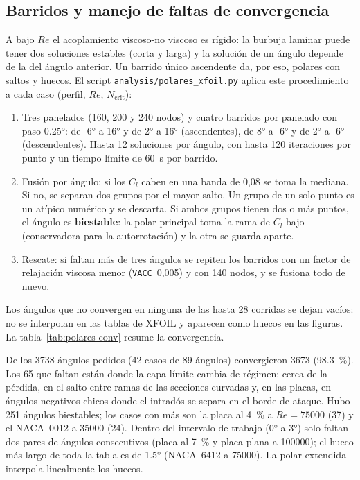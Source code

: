 \subsection{Barridos y manejo de faltas de convergencia}
A bajo $Re$ el acoplamiento viscoso-no viscoso es rígido: la burbuja laminar puede tener
dos soluciones estables (corta y larga) y la solución de un ángulo depende de la del ángulo
anterior. Un barrido único ascendente da, por eso, polares con saltos y huecos. El script
\texttt{analysis/polares\_xfoil.py} aplica este procedimiento a cada caso (perfil, $Re$,
$N_{\text{crit}}$):
\begin{enumerate}
  \item Tres panelados (160, 200 y 240 nodos) y cuatro barridos por panelado con paso
        \ang{0.25}: de \ang{-6} a \ang{16} y de \ang{2} a \ang{16} (ascendentes), de
        \ang{8} a \ang{-6} y de \ang{2} a \ang{-6} (descendentes). Hasta 12 soluciones por
        ángulo, con hasta 120 iteraciones por punto y un tiempo límite de \SI{60}{s} por
        barrido.
  \item Fusión por ángulo: si los $C_l$ caben en una banda de 0,08 se toma la mediana. Si
        no, se separan dos grupos por el mayor salto. Un grupo de un solo punto es un
        atípico numérico y se descarta. Si ambos grupos tienen dos o más puntos, el ángulo es
        \textbf{biestable}: la polar principal toma la rama de $C_l$ bajo (conservadora para
        la autorrotación) y la otra se guarda aparte.
  \item Rescate: si faltan más de tres ángulos se repiten los barridos con un factor de
        relajación viscosa menor (\texttt{VACC}~0,005) y con 140 nodos, y se fusiona todo
        de nuevo.
\end{enumerate}
Los ángulos que no convergen en ninguna de las hasta 28 corridas se dejan vacíos: no se
interpolan en las tablas de XFOIL y aparecen como huecos en las figuras. La
tabla~\ref{tab:polares-conv} resume la convergencia.

De los \num{3738} ángulos pedidos (42 casos de 89 ángulos) convergieron \num{3673}
(\SI{98.3}{\percent}). Los 65 que faltan están donde la capa límite cambia de régimen:
cerca de la pérdida, en el salto entre ramas de las secciones curvadas y, en las placas,
en ángulos negativos chicos donde el intradós se separa en el borde de ataque. Hubo 251
ángulos biestables; los casos con más son la placa al \SI{4}{\percent} a
$Re=\num{75000}$ (37) y el NACA~0012 a \num{35000} (24). Dentro del intervalo de trabajo
(\ang{0} a \ang{3}) solo faltan dos pares de ángulos consecutivos (placa al
\SI{7}{\percent} y placa plana a \num{100000}); el hueco más largo de toda la tabla es de
\ang{1.5} (NACA~6412 a \num{75000}). La polar extendida interpola linealmente los
huecos.

